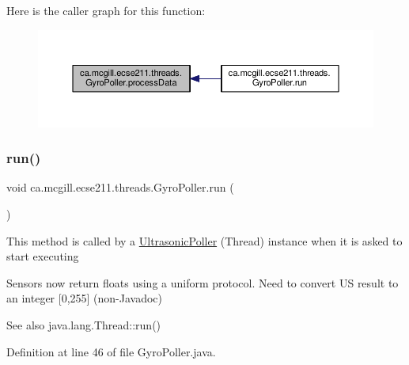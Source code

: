 Here is the caller graph for this function\+:\nopagebreak
\begin{figure}[H]
\begin{center}
\leavevmode
\includegraphics[width=350pt]{classca_1_1mcgill_1_1ecse211_1_1threads_1_1_gyro_poller_a27f914ed77f23805210998fc0ee2daa7_icgraph}
\end{center}
\end{figure}
\mbox{\label{classca_1_1mcgill_1_1ecse211_1_1threads_1_1_gyro_poller_a7a3232e355cece714fa85a3a902d9cfd}} 
\subsubsection{\texorpdfstring{run()}{run()}}
{\footnotesize\ttfamily void ca.\+mcgill.\+ecse211.\+threads.\+Gyro\+Poller.\+run (\begin{DoxyParamCaption}{ }\end{DoxyParamCaption})}

This method is called by a \hyperlink{classca_1_1mcgill_1_1ecse211_1_1threads_1_1_ultrasonic_poller}{Ultrasonic\+Poller} (Thread) instance when it is asked to start executing

Sensors now return floats using a uniform protocol. Need to convert US result to an integer \mbox{[}0,255\mbox{]} (non-\/\+Javadoc)

\begin{DoxySeeAlso}{See also}
java.\+lang.\+Thread\+::run() 
\end{DoxySeeAlso}


Definition at line 46 of file Gyro\+Poller.\+java.


